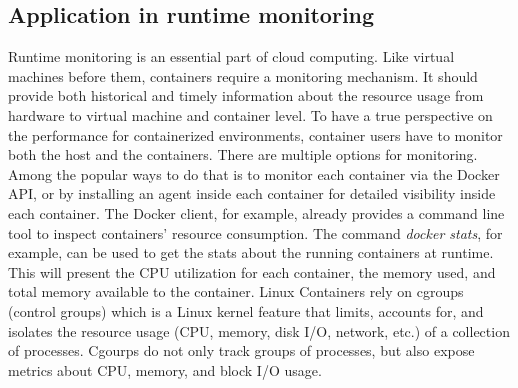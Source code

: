 \subsection{Application in runtime monitoring} 
Runtime monitoring is an essential part of cloud computing\cite{aceto2013cloud}. Like virtual machines before them, containers require a monitoring mechanism. It should provide both historical and timely information about the resource usage from hardware to virtual machine and container level.
To have a true perspective on the performance for containerized environments, container users have to monitor both the host and the containers. There are multiple options for monitoring. 
Among the popular ways to do that is to monitor each container via the Docker API, or by installing an agent inside each container for detailed visibility inside each container. 
The Docker client, for example, already provides a command line tool to inspect containers’ resource consumption. The command \textit{docker stats}, for example, can be used to get the stats about the running containers at runtime. This will present the CPU utilization for each container, the memory used, and total memory available to the container.
Linux Containers rely on cgroups (control groups) which is a Linux kernel feature that limits, accounts for, and isolates the resource usage (CPU, memory, disk I/O, network, etc.) of a collection of processes.
Cgourps do not only track groups of processes, but also expose metrics about CPU, memory, and block I/O usage. 

